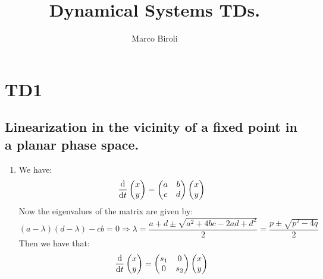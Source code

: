 \documentclass[10pt,a4paper]{book}
\author{Marco Biroli}
\title{Dynamical Systems TDs.}
\begin{document}
\maketitle
\tableofcontents
\chapter{TD1}

\section{Linearization in the vicinity of a fixed point in a planar phase space.}

\begin{enumerate}
\item We have:
\[
\dv{}{t}
\begin{pmatrix}
x\\y
\end{pmatrix} = \begin{pmatrix}
a & b\\
c & d
\end{pmatrix}
\begin{pmatrix}
x\\
y
\end{pmatrix}
\]
Now the eigenvalues of the matrix are given by:
\[
(a - \lambda)(d - \lambda) - cb  = 0 \Rightarrow \lambda = \frac{a + d \pm \sqrt{a^2 + 4 bc - 2 ad + d^2}}{2} = \frac{p \pm \sqrt{p^2 - 4 q}}{2}
\]
Then we have that:
\[
\dv{}{t}
\begin{pmatrix}
x\\y
\end{pmatrix} = \begin{pmatrix}
s_1 & 0\\
0 & s_2
\end{pmatrix}
\begin{pmatrix}
x\\
y
\end{pmatrix}
\]


\end{enumerate}
\end{document}

